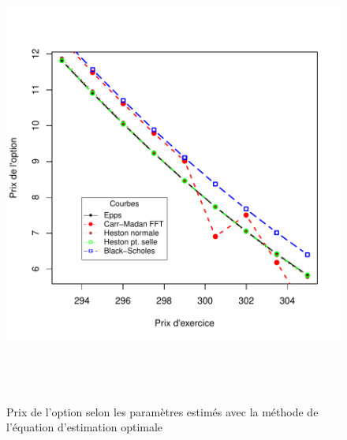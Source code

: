 \begin{figure}[!ht]
  \centering
  \includegraphics[height=6in,
  width=6in]{../graphiques/ABBEYN-callGAL-5.pdf}
  \caption{Prix de l'option selon les paramètres estimés avec la
    méthode de l'équation d'estimation optimale}
  \label{fig:prix1R1-3}
\end{figure}

